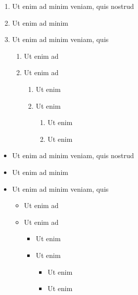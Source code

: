 
\begin{chapterabstract}
	\lipsum[1]
\end{chapterabstract}

\begin{enumerate}
    \item Ut enim ad minim veniam, quis nostrud
    \item Ut enim ad minim 
    \item Ut enim ad minim veniam, quis 
    \begin{enumerate}
        \item Ut enim ad
        \item Ut enim ad
        \begin{enumerate}
            \item Ut enim 
            \item Ut enim 
            \begin{enumerate}
            \item Ut enim 
            \item Ut enim 
        \end{enumerate}
        \end{enumerate}
    \end{enumerate}
\end{enumerate}

\begin{itemize}
    \item Ut enim ad minim veniam, quis nostrud
    \item Ut enim ad minim 
    \item Ut enim ad minim veniam, quis 
    \begin{itemize}
        \item Ut enim ad
        \item Ut enim ad
        \begin{itemize}
            \item Ut enim 
            \item Ut enim 
            \begin{itemize}
            \item Ut enim 
            \item Ut enim 
        \end{itemize}
        \end{itemize}
    \end{itemize}
\end{itemize}

